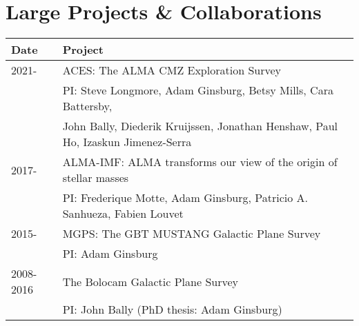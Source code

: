\section*{Large Projects \& Collaborations}

\vspace{-12pt}
\begin{tabular}{p{0.75in}l}
    Date  & Project \\
    \hline
2021- & ACES: The ALMA CMZ Exploration Survey \\
      & PI: Steve Longmore, Adam Ginsburg, Betsy Mills, Cara Battersby, \\
      &    John Bally, Diederik Kruijssen, Jonathan Henshaw, Paul Ho, Izaskun Jimenez-Serra \\ 
2017- & ALMA-IMF: ALMA transforms our view of the origin of stellar masses \\
      &  PI: Frederique Motte, Adam Ginsburg, Patricio A. Sanhueza, Fabien Louvet \\
2015- & MGPS: The GBT MUSTANG Galactic Plane Survey \\
      &      PI: Adam Ginsburg \\
2008-2016 & The Bolocam Galactic Plane Survey \\
      & PI: John Bally (PhD thesis: Adam Ginsburg) \\
\end{tabular}
